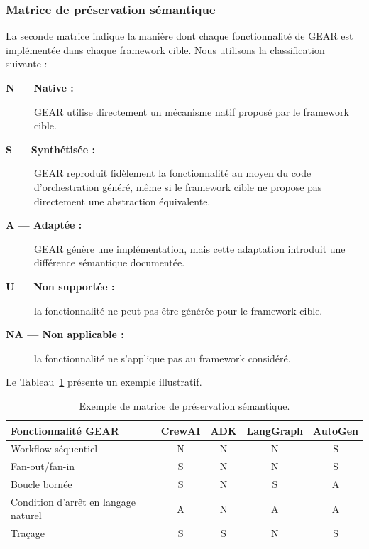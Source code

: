 \subsubsection{Matrice de préservation sémantique}

La seconde matrice indique la manière dont chaque fonctionnalité de
GEAR est implémentée dans chaque framework cible. Nous utilisons la
classification suivante :

\begin{description}
    \item[\textbf{N --- Native :}]
    GEAR utilise directement un mécanisme natif proposé par le
    framework cible.

    \item[\textbf{S --- Synthétisée :}]
    GEAR reproduit fidèlement la fonctionnalité au moyen du code
    d'orchestration généré, même si le framework cible ne propose pas
    directement une abstraction équivalente.

    \item[\textbf{A --- Adaptée :}]
    GEAR génère une implémentation, mais cette adaptation introduit une
    différence sémantique documentée.

    \item[\textbf{U --- Non supportée :}]
    la fonctionnalité ne peut pas être générée pour le framework cible.

    \item[\textbf{NA --- Non applicable :}]
    la fonctionnalité ne s'applique pas au framework considéré.
\end{description}

Le Tableau~\ref{tab:preservation-semantique} présente un exemple
illustratif.

\begin{table}[t]
    \centering
    \caption{Exemple de matrice de préservation sémantique.}
    \label{tab:preservation-semantique}
    \begin{tabularx}{\textwidth}{@{}>{\raggedright\arraybackslash}Xcccc@{}}
        \toprule
        \textbf{Fonctionnalité GEAR}
        & \textbf{CrewAI}
        & \textbf{ADK}
        & \textbf{LangGraph}
        & \textbf{AutoGen} \\
        \midrule
        Workflow séquentiel
            & N & N & N & S \\
        Fan-out/fan-in
            & S & N & N & S \\
        Boucle bornée
            & S & N & S & A \\
        Condition d'arrêt en langage naturel
            & A & N & A & A \\
        Traçage
            & S & S & N & S \\
        \bottomrule
    \end{tabularx}
\end{table}

